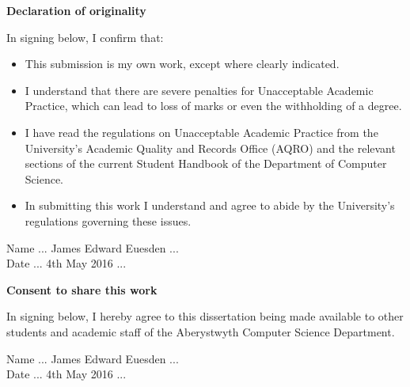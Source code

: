 \thispagestyle{empty}

\begin{center}
    {\LARGE\bf Declaration of originality}
\end{center}

In signing below, I confirm that:

\begin{itemize}
\item{This submission is my own work, except where 
clearly indicated.}

\item{I understand that there are severe penalties for 
Unacceptable Academic Practice, which can lead to loss 
of marks or even the withholding of a degree.}
 
\item{I have read the regulations on Unacceptable Academic 
Practice from the University's Academic Quality and 
Records Office (AQRO) and the relevant sections of the 
current Student Handbook of the Department of 
Computer Science.}
 
\item{In submitting this work I understand and agree to 
abide by the University's regulations governing these issues.}
\end{itemize}

\vspace{2em}
Name ... James Edward Euesden ...  \\

\vspace{1em}
Date ... 4th May 2016 ... \\

\vspace{1em}
\begin{center}
    {\LARGE\bf Consent to share this work}
\end{center}

In signing below, I hereby agree to this dissertation being made available to other
students and academic staff of the Aberystwyth Computer Science Department.  

\vspace{2em}
Name ... James Edward Euesden ...  \\

\vspace{1em}
Date ... 4th May 2016 ... \\


